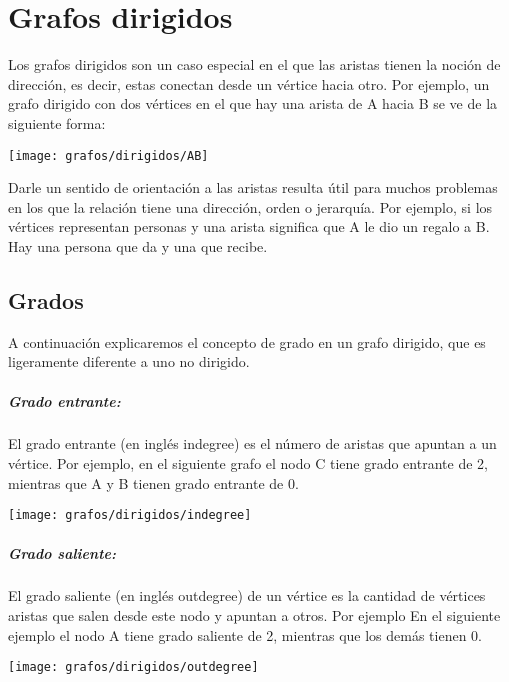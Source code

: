 \chapter{Grafos dirigidos}

Los grafos dirigidos son un caso especial en el que las aristas tienen la noción de dirección, es decir, estas conectan desde un vértice hacia otro. Por ejemplo, un grafo dirigido con dos vértices en el que hay una arista de A hacia B se ve de la siguiente forma:

\begin{center}
	\texttt{[image: grafos/dirigidos/AB]}
\end{center}

Darle un sentido de orientación a las aristas resulta útil para muchos problemas en los que la relación tiene una dirección, orden o jerarquía. Por ejemplo, si los vértices representan personas y una arista significa que A le dio un regalo a B. Hay una persona que da y una que recibe.

\section{Grados}
A continuación explicaremos el concepto de grado en un grafo dirigido, que es ligeramente diferente a uno no dirigido.

\paragraph{Grado entrante:} El grado entrante (en inglés indegree) es el número de aristas que apuntan a un vértice. Por ejemplo, en el siguiente grafo el nodo C tiene grado entrante de 2, mientras que A y B tienen grado entrante de 0.

\begin{center}
	\texttt{[image: grafos/dirigidos/indegree]}
\end{center}

\paragraph{Grado saliente:} El grado saliente (en inglés outdegree) de un vértice es la cantidad de vértices aristas que salen desde este nodo y apuntan a otros. Por ejemplo En el siguiente ejemplo el nodo A tiene grado saliente de 2, mientras que los demás tienen 0.

\begin{center}
	\texttt{[image: grafos/dirigidos/outdegree]}
\end{center}

